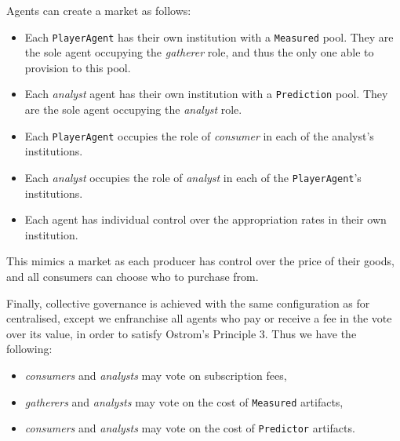 Agents can create a market as follows:

\begin{itemize}
\item Each \texttt{PlayerAgent} has their own institution with a \texttt{Measured} pool. They are the sole agent occupying the \emph{gatherer} role, and thus the only one able to provision to this pool.
\item Each \emph{analyst} agent has their own institution with a \texttt{Prediction} pool. They are the sole agent occupying the \emph{analyst} role.
\item Each \texttt{PlayerAgent} occupies the role of \emph{consumer} in each of the analyst's institutions.
\item Each \emph{analyst} occupies the role of \emph{analyst} in each of the \texttt{PlayerAgent}'s institutions.
\item Each agent has individual control over the appropriation rates in their own institution.
\end{itemize}

This mimics a market as each producer has control over the price of their goods, and all consumers can choose who to purchase from.

Finally, collective governance is achieved with the same configuration as for centralised, except we enfranchise all agents who pay or receive a fee in the vote over its value, in order to satisfy Ostrom's Principle 3. Thus we have the following:

\begin{itemize}
\item \emph{consumers} and \emph{analysts} may vote on subscription fees,
\item \emph{gatherers} and \emph{analysts} may vote on the cost of \texttt{Measured} artifacts,
\item \emph{consumers} and \emph{analysts} may vote on the cost of \texttt{Predictor} artifacts.
\end{itemize}


